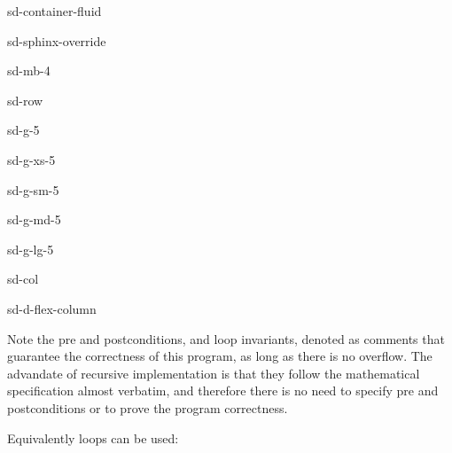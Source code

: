\documentclass[a4paper,10pt,english]{jupyterBook}
\begin{document}
\begin{sphinxuseclass}{sd-container-fluid}
\begin{sphinxuseclass}{sd-sphinx-override}
\begin{sphinxuseclass}{sd-mb-4}
\begin{sphinxuseclass}{sd-row}
\begin{sphinxuseclass}{sd-g-5}
\begin{sphinxuseclass}{sd-g-xs-5}
\begin{sphinxuseclass}{sd-g-sm-5}
\begin{sphinxuseclass}{sd-g-md-5}
\begin{sphinxuseclass}{sd-g-lg-5}
\begin{sphinxuseclass}{sd-col}
\begin{sphinxuseclass}{sd-d-flex-column}
\end{sphinxuseclass}
\end{sphinxuseclass}
\end{sphinxuseclass}
\end{sphinxuseclass}
\end{sphinxuseclass}
\end{sphinxuseclass}
\end{sphinxuseclass}
\end{sphinxuseclass}
\end{sphinxuseclass}
\end{sphinxuseclass}
\end{sphinxuseclass}
\sphinxAtStartPar
Note the pre\sphinxhyphen{} and post\sphinxhyphen{}conditions, and loop invariants, denoted as comments that guarantee the correctness of this program, as long as there is no overflow. The advandate of recursive implementation is that they follow the mathematical specification almost verbatim, and therefore there is no need to specify pre\sphinxhyphen{} and post\sphinxhyphen{}conditions or to prove the program correctness.

\sphinxAtStartPar
Equivalently  loops can be used:
\end{document}
